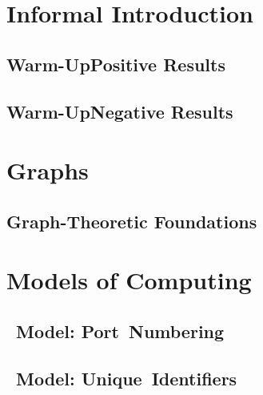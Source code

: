 





\frontmatter
\maketitle
\tableofcontents



\label{ch:math}


\mainmatter
\part{Informal Introduction}

\chapter{Warm-Up\mydash Positive Results}\label{ch:intro-pos}


\chapter{Warm-Up\mydash Negative Results}\label{ch:intro-neg}


\part{Graphs}

\chapter{Graph-Theoretic Foundations}\label{ch:graphs}


\part{Models of Computing}

\chapter{\tPN{}~Model: Port~Numbering}\label{ch:pn}


\chapter{\tLOCAL{}~Model: Unique~Identifiers}\label{ch:local}


